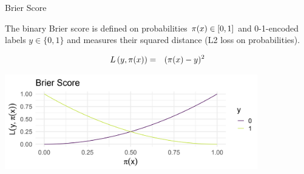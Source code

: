 



\begin{vbframe}{Brier Score}

The binary Brier score is defined on probabilities $\pi(x) \in [0, 1]$ and 0-1-encoded labels $y \in \{0, 1\}$ and measures their squared distance (L2 loss on probabilities).

\begin{eqnarray*}
L\left(y, \pi(x)\right) &=& (\pi(x) - y)^2
\end{eqnarray*}

\vspace{0.2cm}
\begin{center}
\includegraphics[width = 11cm ]{figure_man/Brier-score.png} \\
\end{center}


\end{vbframe}

